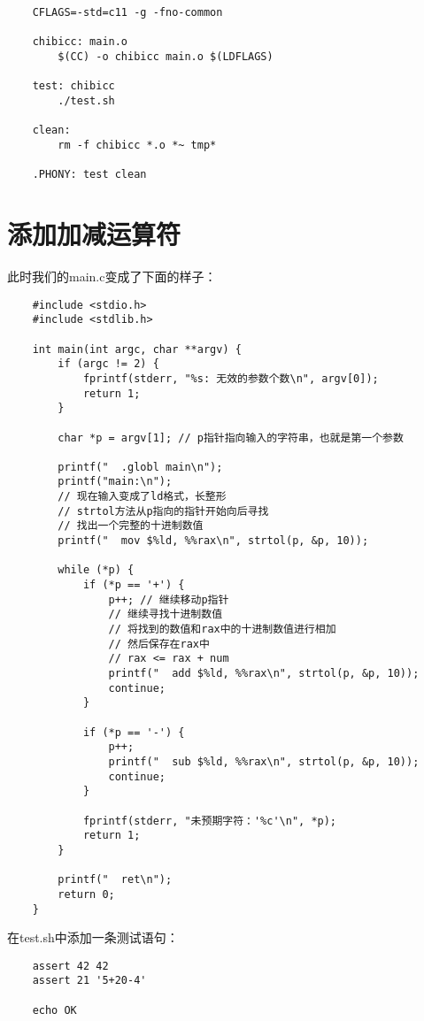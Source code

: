 \documentclass[cn,10pt,math=newtx,citestyle=gb7714-2015,bibstyle=gb7714-2015]{elegantbook}
\begin{document}
\begin{verbatim}
    CFLAGS=-std=c11 -g -fno-common

    chibicc: main.o
        $(CC) -o chibicc main.o $(LDFLAGS)

    test: chibicc
        ./test.sh

    clean:
        rm -f chibicc *.o *~ tmp*

    .PHONY: test clean
\end{verbatim}

\chapter{添加加减运算符}

此时我们的main.c变成了下面的样子：

\begin{verbatim}
    #include <stdio.h>
    #include <stdlib.h>

    int main(int argc, char **argv) {
        if (argc != 2) {
            fprintf(stderr, "%s: 无效的参数个数\n", argv[0]);
            return 1;
        }

        char *p = argv[1]; // p指针指向输入的字符串，也就是第一个参数

        printf("  .globl main\n");
        printf("main:\n");
        // 现在输入变成了ld格式，长整形
        // strtol方法从p指向的指针开始向后寻找
        // 找出一个完整的十进制数值
        printf("  mov $%ld, %%rax\n", strtol(p, &p, 10));

        while (*p) {
            if (*p == '+') {
                p++; // 继续移动p指针
                // 继续寻找十进制数值
                // 将找到的数值和rax中的十进制数值进行相加
                // 然后保存在rax中
                // rax <= rax + num
                printf("  add $%ld, %%rax\n", strtol(p, &p, 10));
                continue;
            }

            if (*p == '-') {
                p++;
                printf("  sub $%ld, %%rax\n", strtol(p, &p, 10));
                continue;
            }

            fprintf(stderr, "未预期字符：'%c'\n", *p);
            return 1;
        }

        printf("  ret\n");
        return 0;
    }
\end{verbatim}

在test.sh中添加一条测试语句：

\begin{verbatim}
    assert 42 42
    assert 21 '5+20-4'

    echo OK
\end{verbatim}
\end{document}
